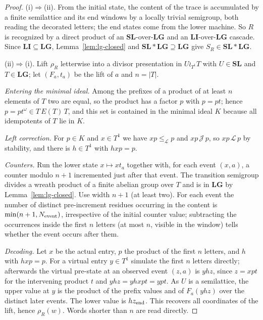 \documentclass[11pt]{article}
\numberwithin{equation}{section}
\theoremstyle{plain}
\theoremstyle{definition}
\theoremstyle{remark}
\theoremstyle{plain}
\newcommand{\LG}{\mathbf{LG}}
\newcommand{\LI}{\mathbf{LI}}
\newcommand{\SL}{\mathbf{SL}}
\begin{document}
\begin{proof}
(i)$\Rightarrow$(ii).  From the initial state, the content of the trace is
accumulated by a finite semilattice and its end windows by a locally trivial
semigroup, both reading the decorated letters; the end states come from the lower
machine.  So $R$ is recognized by a direct product of an $\SL$-over-$\LG$ and an
$\LI$-over-$\LG$ cascade.  Since $\LI\subseteq\LG$, Lemma~\ref{lem:lg-closed} and
$\SL*\LG\supseteq\LG$ give $S_R\in\SL*\LG$.

(ii)$\Rightarrow$(i).  Lift $\rho_R$ letterwise into a divisor presentation in
$U\wr_{T^1}T$ with $U\in\SL$ and $T\in\LG$; let $(F_a,t_a)$ be the lift of $a$ and
$n=|T|$.

\emph{Entering the minimal ideal.}  Among the prefixes of a product of at least
$n$ elements of $T$ two are equal, so the product has a factor $p$ with $p=pt$;
hence $p=pt^\omega\in T\,E(T)\,T$, and this set is contained in the minimal ideal
$K$ because all idempotents of $T$ lie in $K$.

\emph{Left correction.}  For $p\in K$ and $x\in T^1$ we have $xp\le_{\mathcal L}p$
and $xp\,\mathcal J\,p$, so $xp\,\mathcal L\,p$ by stability, and there is
$h\in T^1$ with $hxp=p$.

\emph{Counters.}  Run the lower state $x\mapsto xt_a$ together with, for each
event $(x,a)$, a counter modulo $n+1$ incremented just after that event.  The
transition semigroup divides a wreath product of a finite abelian group over $T$
and is in $\LG$ by Lemma~\ref{lem:lg-closed}.  Use width $n+1$ (at least two).
For each event the number of distinct pre-increment residues occurring in the
content is $\min(n+1,N_{\rm event})$, irrespective of the initial counter
value; subtracting the occurrences inside the first $n$ letters (at most $n$,
visible in the window) tells whether the event occurs after them.

\emph{Decoding.}  Let $x$ be the actual entry, $p$ the product of the first $n$
letters, and $h$ with $hxp=p$.  For a virtual entry $y\in T^1$ simulate the first
$n$ letters directly; afterwards the virtual pre-state at an observed event
$(z,a)$ is $yhz$, since $z=xpt$ for the intervening product $t$ and
$yhz=yhxpt=ypt$.  As $U$ is a semilattice, the upper value at $y$ is the product
of the prefix values and of $F_a(yhz)$ over the distinct later events.  The
lower value is $hz_{\rm end}$.  This recovers all coordinates of the lift, hence
$\rho_R(w)$.  Words shorter than $n$ are read directly.
\end{proof}
\end{document}

